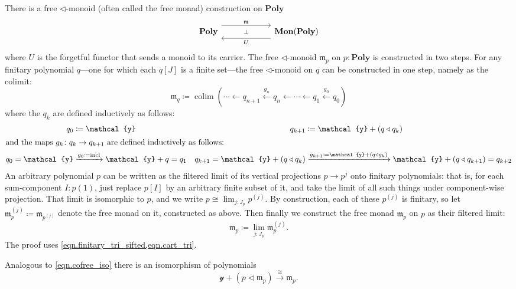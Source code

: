 \documentclass[11pt, one side, article]{memoir}
\theoremstyle{definition}
\theoremstyle{plain}
\DeclareMathOperator*{\colim}{colim}
\newcommand{\Cat}[1]{\mathbf{#1}}%
\newcommand{\To}[2][]{\xrightarrow[#1]{#2}}
\newcommand{\from}{\leftarrow}
\newcommand{\From}[1]{\xleftarrow{#1}}
\newcommand{\tn}[1]{\textnormal{#1}}
\newcommand{\yon}{\mathcal{y}}
\newcommand{\poly}{\Cat{Poly}}
\newcommand{\0}{\textsf{0}}
\newcommand{\1}{\tn{\textsf{1}}}
\newcommand{\tri}{\mathbin{\triangleleft}}
\newcommand{\free}{\mathfrak{m}}
\begin{document}
There is a free $\tri$-monoid (often called the free monad) construction on $\poly$
\begin{equation}
\begin{tikzcd}[column sep=60pt]
	\poly
  	\ar[from=r, shift left=8pt, "U"]
		\ar[from=r, phantom, "\scriptstyle\bot"]
  	&
	\Cat{Mon}(\poly)
		\ar[from=l, shift right=-8pt, "\free"]
\end{tikzcd}
\end{equation}
where $U$ is the forgetful functor that sends a monoid to its carrier. The free $\tri$-monoid $\free_p$ on $p:\poly$ is constructed in two steps. For any finitary polynomial $q$---one for which each $q[J]$ is a finite set---the free $\tri$-monoid on $q$ can be constructed in one step, namely as the colimit:
\begin{equation}
	\free_q\coloneqq\colim(\cdots\from q_{n+1}\From{g_n}q_n\from\cdots\from q_1\From{g_0} q_0)
\end{equation}
where the $q_k$ are defined inductively as follows:
\begin{align}
	q_0&\coloneqq \yon&q_{k+1}&\coloneqq \yon+(q\tri q_k)\\
\intertext{and the maps $g_k\colon q_{k}\to q_{k+1}$ are defined inductively as follows:}
	q_0=\yon&\To{g_0\coloneqq\tn{incl}}\yon+q=q_1&q_{k+1}=\yon+(q\tri q_{k})&\To{g_{k+1}\coloneqq\yon+(q\tri g_k)}\yon+(q\tri q_{k+1})=q_{k+2}
\end{align}
An arbitrary polynomial $p$ can be written as the filtered limit of its vertical projections $p\to p^{j}$ onto finitary polynomials: that is, for each sum-component $I: p(1)$, just replace $p[I]$ by an arbitrary finite subset of it, and take the limit of all such things under component-wise projection. That limit is isomorphic to $p$, and we write $p\cong\lim_{j: J_p}p^{(j)}$. By construction, each of these $p^{(j)}$ is finitary, so let $\free_p^{(j)}\coloneqq\free_{p^{(j)}}$ denote the free monad on it, constructed as above. Then finally we construct the free monad $\free_p$ on $p$ as their filtered limit:
\begin{equation}
	\free_p\coloneqq\lim_{j: J_p}\free_p^{(j)}.
\end{equation}
The proof uses \cref{eqn.finitary_tri_sifted,eqn.cart_tri}.

Analogous to \cref{eqn.cofree_iso} there is an isomorphism of polynomials
\begin{equation}
	 \yon+(p\tri\free_p)\To{\cong}\free_p.
	\end{equation}
\end{document}
